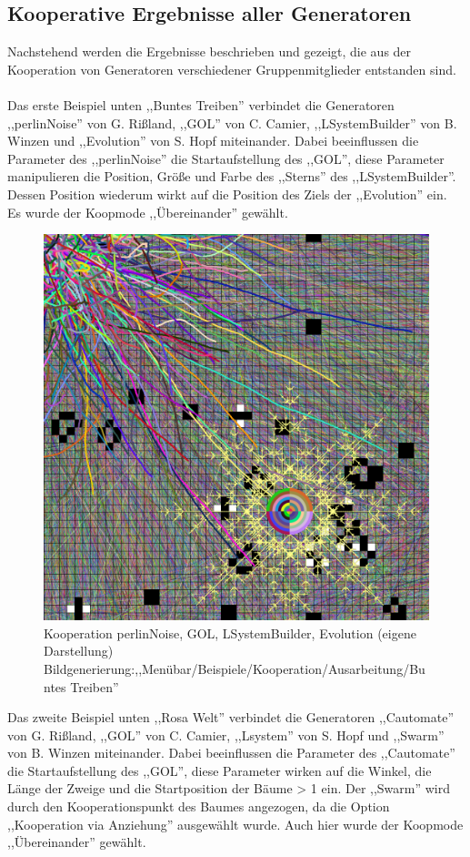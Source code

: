 \documentclass[../mciAusarbeitung.tex]{subfiles}
\begin{document}
	\subsection{Kooperative Ergebnisse aller Generatoren}
	Nachstehend werden die Ergebnisse beschrieben und gezeigt, die aus der Kooperation von Generatoren verschiedener Gruppenmitglieder entstanden sind.\\	
	\\
	Das erste Beispiel unten ,,Buntes Treiben'' verbindet die Generatoren ,,perlinNoise'' von G. Rißland, ,,GOL'' von C. Camier, ,,LSystemBuilder'' von B. Winzen und ,,Evolution'' von S. Hopf miteinander. Dabei beeinflussen die Parameter des ,,perlinNoise'' die Startaufstellung des ,,GOL'', diese Parameter manipulieren die Position, Größe und Farbe des ,,Sterns'' des ,,LSystemBuilder''. Dessen Position wiederum wirkt auf die Position des Ziels der ,,Evolution'' ein.\\
	Es wurde der Koopmode ,,Übereinander'' gewählt. \\
		\begin{figure}[H]
			\centering
			\includegraphics[width=0.8\linewidth]{img/buntesTreiben.png}
			\caption[Buntes Treiben]{Kooperation perlinNoise, GOL, LSystemBuilder, Evolution (eigene Darstellung)\\
			Bildgenerierung:,,Menübar/Beispiele/Kooperation/Ausarbeitung/Buntes Treiben''}
		\end{figure}
	\noindent Das zweite Beispiel unten ,,Rosa Welt'' verbindet die Generatoren ,,Cautomate'' von G. Rißland, ,,GOL'' von C. Camier, ,,Lsystem'' von S. Hopf und ,,Swarm'' von B. Winzen miteinander. Dabei beeinflussen die Parameter des ,,Cautomate'' die Startaufstellung des ,,GOL'', diese Parameter wirken auf die Winkel, die Länge der Zweige und die Startposition der Bäume > 1 ein. Der ,,Swarm'' wird durch den Kooperationspunkt des Baumes angezogen, da die Option ,,Kooperation via Anziehung'' ausgewählt wurde. Auch hier wurde der Koopmode ,,Übereinander'' gewählt.\\
\end{document}
